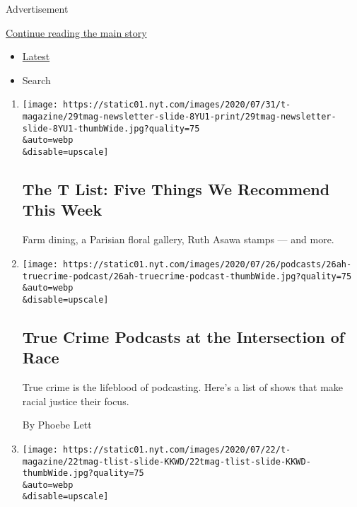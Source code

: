 Advertisement

\protect\hyperlink{after-mid1}{Continue reading the main story}

\begin{itemize}
\tightlist
\item
  \protect\hyperlink{stream-panel}{Latest}
\item
  Search
\end{itemize}

\begin{enumerate}
\def\labelenumi{\arabic{enumi}.}
\item
  \href{/2020/07/30/t-magazine/the-t-list-five-things-we-recommend-this-week.html}{}

  \texttt{[image: https://static01.nyt.com/images/2020/07/31/t-magazine/29tmag-newsletter-slide-8YU1-print/29tmag-newsletter-slide-8YU1-thumbWide.jpg?quality=75\\\&auto=webp\\\&disable=upscale]}

  \hypertarget{the-t-list-five-things-we-recommend-this-week}{%
  \subsection{The T List: Five Things We Recommend This
  Week}\label{the-t-list-five-things-we-recommend-this-week}}

  Farm dining, a Parisian floral gallery, Ruth Asawa stamps --- and
  more.
\item
  \href{/2020/07/25/at-home/coronavirus-true-crime-podcasts-race.html}{}

  \texttt{[image: https://static01.nyt.com/images/2020/07/26/podcasts/26ah-truecrime-podcast/26ah-truecrime-podcast-thumbWide.jpg?quality=75\\\&auto=webp\\\&disable=upscale]}

  \hypertarget{true-crime-podcasts-at-the-intersection-of-race}{%
  \subsection{True Crime Podcasts at the Intersection of
  Race}\label{true-crime-podcasts-at-the-intersection-of-race}}

  True crime is the lifeblood of podcasting. Here's a list of shows that
  make racial justice their focus.

  By Phoebe Lett
\item
  \href{/2020/07/23/t-magazine/puzzles-bug-spray-tlist.html}{}

  \texttt{[image: https://static01.nyt.com/images/2020/07/22/t-magazine/22tmag-tlist-slide-KKWD/22tmag-tlist-slide-KKWD-thumbWide.jpg?quality=75\\\&auto=webp\\\&disable=upscale]}


\end{enumerate}
